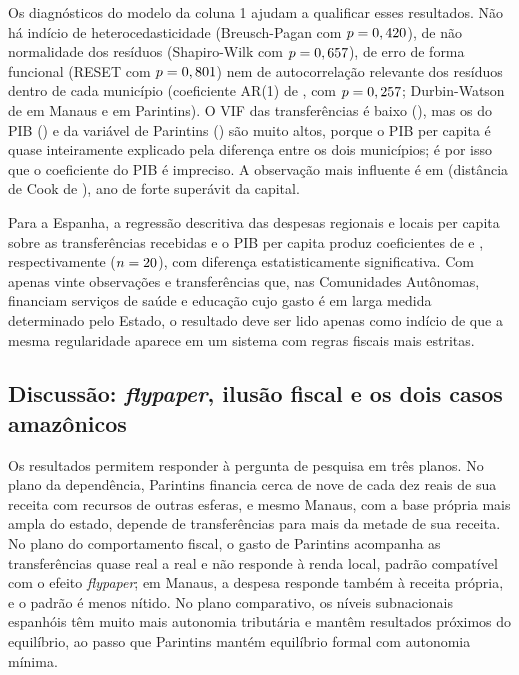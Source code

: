Os diagnósticos do modelo da coluna 1 ajudam a qualificar esses resultados. Não há indício de heterocedasticidade (Breusch-Pagan com $p=0,420$), de não normalidade dos resíduos (Shapiro-Wilk com $p=0,657$), de erro de forma funcional (RESET com $p=0,801$) nem de autocorrelação relevante dos resíduos dentro de cada município (coeficiente AR(1) de \arRho, com $p=0,257$; Durbin-Watson de \dwMan{} em Manaus e \dwPar{} em Parintins). O VIF das transferências é baixo (\vifTr), mas os do PIB (\vifPib) e da variável de Parintins (\vifPar) são muito altos, porque o PIB per capita é quase inteiramente explicado pela diferença entre os dois municípios; é por isso que o coeficiente do PIB é impreciso. A observação mais influente é \cookMun{} em \cookAno{} (distância de Cook de \cookMax{}), ano de forte superávit da capital.

Para a Espanha, a regressão descritiva das despesas regionais e locais per capita sobre as transferências recebidas e o PIB per capita produz coeficientes de \esbTr{} e \esbPib{}, respectivamente ($n=20$), com diferença estatisticamente significativa. Com apenas vinte observações e transferências que, nas Comunidades Autônomas, financiam serviços de saúde e educação cujo gasto é em larga medida determinado pelo Estado, o resultado deve ser lido apenas como indício de que a mesma regularidade aparece em um sistema com regras fiscais mais estritas.

\subsection{Discussão: \textit{flypaper}, ilusão fiscal e os dois casos amazônicos}

Os resultados permitem responder à pergunta de pesquisa em três planos. No plano da dependência, Parintins financia cerca de nove de cada dez reais de sua receita com recursos de outras esferas, e mesmo Manaus, com a base própria mais ampla do estado, depende de transferências para mais da metade de sua receita. No plano do comportamento fiscal, o gasto de Parintins acompanha as transferências quase real a real e não responde à renda local, padrão compatível com o efeito \textit{flypaper}; em Manaus, a despesa responde também à receita própria, e o padrão é menos nítido. No plano comparativo, os níveis subnacionais espanhóis têm muito mais autonomia tributária e mantêm resultados próximos do equilíbrio, ao passo que Parintins mantém equilíbrio formal com autonomia mínima.


